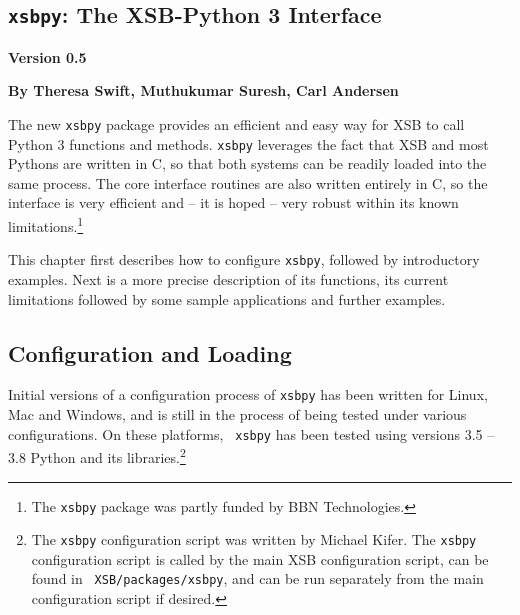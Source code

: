 
\newcommand{\xsbpyversion}{Version 0.5}

\begin{center}
\chapter[XSB and Python]{{\tt xsbpy}: The XSB-Python 3 Interface} \label{chap:xsbpy}
\end{center}

\vspace*{-.30in} 
\begin{center}
{\Large {\bf  \xsbpyversion}}
\end{center}

\begin{center}
  {\Large {\bf By Theresa Swift, Muthukumar Suresh, Carl Andersen}}
\end{center}

\noindent

%

The new {\tt xsbpy} package provides an efficient and easy way for XSB
to call Python 3 functions and methods.  {\tt xsbpy} leverages the
fact that XSB and most Pythons are written in C, so that both systems
can be readily loaded into the same process. The core interface
routines are also written entirely in C, so the interface is very
efficient and -- it is hoped -- very robust within its known
limitations.\footnote{The {\tt xsbpy} package was partly funded by BBN
  Technologies.}

This chapter first describes how to configure {\tt xsbpy}, followed by
introductory examples.  Next is a more precise description of its
functions, its current limitations followed by some sample
applications and further examples.

\section{Configuration and Loading}

Initial versions of a configuration process of {\tt xsbpy} has been
written for Linux, Mac and Windows, and is still in the process of
being tested under various configurations.  On these platforms, {\tt
  xsbpy} has been tested using versions 3.5 -- 3.8 Python and its
libraries.\footnote{The {\tt xsbpy} configuration script was written
  by Michael Kifer.  The {\tt xsbpy} configuration script is called by
  the main XSB configuration script, can be found in {\tt
    XSB/packages/xsbpy}, and can be run separately from the main
  configuration script if desired.}

